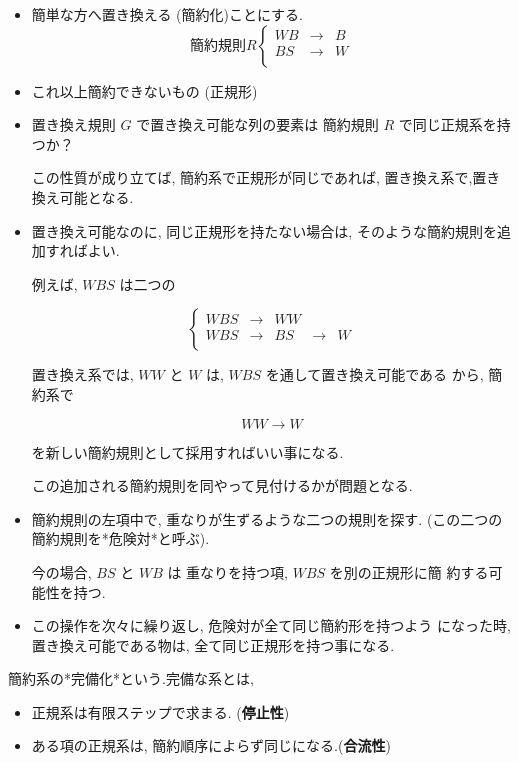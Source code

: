 \documentclass[a4j]{jarticle}
\begin{document}
\begin{itemize}
\item 簡単な方へ置き換える (簡約化)ことにする.
$$簡約規則 R \left\{ \begin{array}{rll}
   WB & \rightarrow  &  B\\
   BS & \rightarrow   & W  \\
         \end{array}
   \right.$$

\item これ以上簡約できないもの (正規形)

\item 置き換え規則 \(G\) で置き換え可能な列の要素は 簡約規則 \(R\)
で同じ正規系を持つか？

この性質が成り立てば, 簡約系で正規形が同じであれば,
置き換え系で,置き換え可能となる.

\item 置き換え可能なのに, 同じ正規形を持たない場合は,
そのような簡約規則を追加すればよい.

例えば, \(WBS\) は二つの

$$\left\{ \begin{array}{rllll}
   WBS & \rightarrow  &  WW\\
   WBS & \rightarrow   & BS & \rightarrow  & W\\
         \end{array}
   \right.$$

置き換え系では, \(WW\) と \(W\) は, \(WBS\) を通して置き換え可能である
から, 簡約系で

$$WW  \rightarrow   W$$

を新しい簡約規則として採用すればいい事になる.

この追加される簡約規則を同やって見付けるかが問題となる.

\item 簡約規則の左項中で, 重なりが生ずるような二つの規則を探す.
(この二つの簡約規則を*危険対*と呼ぶ).

今の場合, \(BS\) と \(WB\) は 重なりを持つ項, \(WBS\) を別の正規形に簡
約する可能性を持つ.

\item この操作を次々に繰り返し, 危険対が全て同じ簡約形を持つよう
になった時, 置き換え可能である物は, 全て同じ正規形を持つ事になる.
\end{itemize}

簡約系の*完備化*という.完備な系とは,

\begin{itemize}
\item 正規系は有限ステップで求まる. (\textbf{停止性})

\item ある項の正規系は, 簡約順序によらず同じになる.(\textbf{合流性})
\end{itemize}
\end{document}
